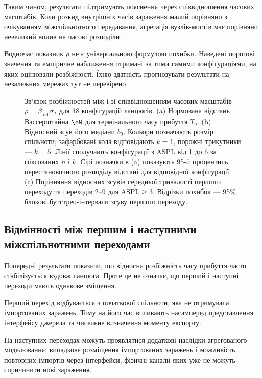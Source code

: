 Таким чином, результати
підтримують пояснення
через співвідношення
часових масштабів.
Коли розкид внутрішніх
часів зараження малий
порівняно з очікуванням
міжспільнотного передавання,
агрегація вузлів-мостів
має порівняно невеликий
вплив на часові розподіли.

Водночас показник $\rho$
не є універсальною формулою
похибки. Наведені порогові
значення та емпіричне
наближення отримані
за тими самими конфігураціями,
на яких оцінювали розбіжності.
Їхню здатність прогнозувати
результати на незалежних
мережах тут не перевірено.

\begin{figure}[tbp]
\centering
\caption{%
Зв'язок розбіжностей між \Full{}
і \TS{} зі співвідношенням
часових масштабів
$\rho=\beta_{\mathrm{out}}\sigma_T$
для 48 конфігурацій ланцюгів.
(a) Нормована відстань Вассерштайна
$\eW$ для термінального часу
прибуття $T_9$.
(b) Відносний зсув його медіани $b_9$.
Кольори позначають розмір спільноти;
зафарбовані кола відповідають $k=1$,
порожні трикутники --- $k=5$.
Лінії сполучають конфігурації
з ASPL від 1 до 6 за фіксованих
$n$ і $k$. Сірі позначки в (a)
показують 95-й процентиль
перестановочного розподілу
відстані для відповідної конфігурації.
(c) Порівняння відносних зсувів
середньої тривалості першого
переходу та переходів 2--9
для $\mathrm{ASPL}\geq3$.
Відрізки похибок --- 95\%
блокові бутстреп-інтервали
зсуву першого переходу.
}
\label{fig:descriptor}
\end{figure}


\subsection{Відмінності між першим
і наступними міжспільнотними переходами}

Попередні результати показали,
що відносна розбіжність часу
прибуття часто стабілізується
вздовж ланцюга.
Проте це не означає,
що перший і наступні переходи
мають однакове зміщення.

Перший перехід відбувається
з початкової спільноти,
яка не отримувала імпортованих
заражень. Тому на його час
впливають насамперед
представлення інтерфейсу
джерела та чисельне
визначення моменту експорту.

На наступних переходах
можуть проявлятися
додаткові наслідки
агрегованого моделювання:
випадкове розміщення
імпортованих заражень
і можливість повторних
імпортів через інтерфейси,
фізичні канали яких
уже не можуть спричинити
нові зараження.

